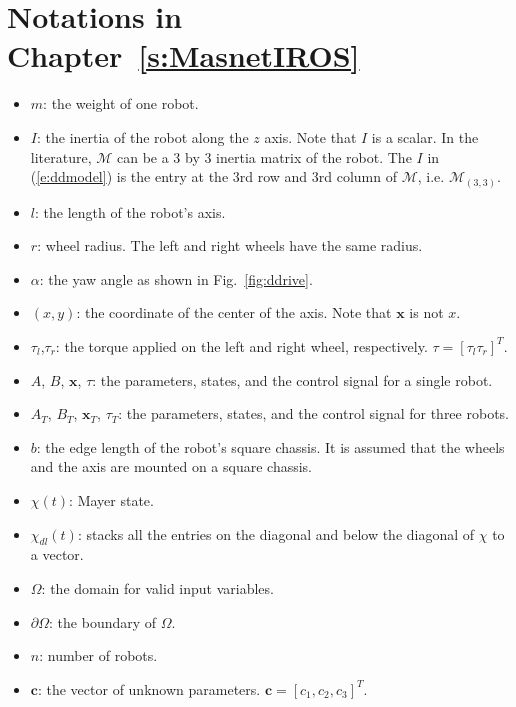 \section{Notations in {Chapter~\ref{s:MasnetIROS}}}
\begin{itemize}
\item $m$: the weight of one robot.
\item $I$: the inertia of the robot along the $z$ axis. Note that $I$ is a scalar. In the literature, $\mathcal{M}$ can be a 3 by 3 inertia matrix of the robot. The $I$ in (\ref{e:ddmodel}) is the entry at the 3rd row and 3rd column of $\mathcal{M}$, i.e. $\mathcal{M}_{(3,3)}$.
\item $l$: the length of the robot's axis.
\item $r$: wheel radius. The left and right wheels have the same radius.
\item $\alpha$: the yaw angle as shown in Fig.~\ref{fig:ddrive}.
\item $(x,y)$: the coordinate of the center of the axis. Note that $\mathbf{x}$ is not $x$.
\item $\tau_l$,$\tau_r$: the torque applied on the left and right wheel, respectively. $\tau=[\tau_l \tau_r]^T$.
\item $A$, $B$, $\mathbf{x}$, $\tau$: the parameters, states, and the control signal for a single robot.
\item $A_T$, $B_T$, $\mathbf{x}_T$, $\tau_T$: the parameters, states, and the control signal for three robots.
\item $b$: the edge length of the robot's square chassis. It is assumed that the wheels and the axis are mounted on a square chassis.
\item $\chi(t)$: Mayer state.
\item $\chi_{dl}(t)$: stacks all the entries on the diagonal and below the diagonal of $\chi$ to a vector.
\item $\Omega$: the domain for valid input variables.
\item $\partial\Omega$: the boundary of $\Omega$.
\item $n$: number of robots.
\item $\mathbf{c}$: the vector of unknown parameters. $\mathbf{c}=[c_1, c_2, c_3]^T$.
\end{itemize}

